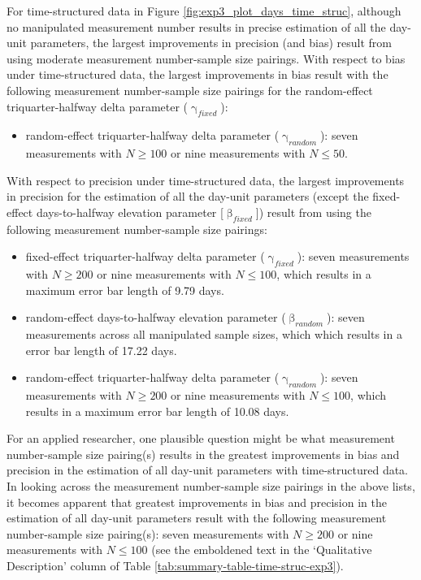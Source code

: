 \documentclass[
12pt, %
twoside,
english]{guelphthesis}
\theoremstyle{definition}
\theoremstyle{definition}
\theoremstyle{definition}
\theoremstyle{definition}
\theoremstyle{remark}
\begin{document}
For time-structured data in Figure \ref{fig:exp3_plot_days_time_struc}, although no manipulated measurement number results in precise estimation of all the day-unit parameters, the largest improvements in precision (and bias) result from using moderate measurement number-sample size pairings. With respect to bias under time-structured data, the largest improvements in bias result with the following measurement number-sample size pairings for the random-effect triquarter-halfway delta parameter (\(\upgamma_{fixed}\)):
\begin{itemize}
\tightlist
\item
  random-effect triquarter-halfway delta parameter (\(\upgamma_{random}\)): seven measurements with \(N \ge 100\) or nine measurements with \(N \le 50\).
\end{itemize}
\noindent With respect to precision under time-structured data, the largest improvements in precision for the estimation of all the day-unit parameters (except the fixed-effect days-to-halfway elevation parameter {[}\(\upbeta_{fixed}\){]}) result from using the following measurement number-sample size pairings:
\begin{itemize}
\tightlist
\item
  fixed-effect triquarter-halfway delta parameter (\(\upgamma_{fixed}\)): seven measurements with \(N \ge 200\) or nine measurements with \(N \le 100\), which results in a maximum error bar length of 9.79 days.
\item
  random-effect days-to-halfway elevation parameter (\(\upbeta_{random}\)): seven measurements across all manipulated sample sizes, which which results in a error bar length of 17.22 days.
\item
  random-effect triquarter-halfway delta parameter (\(\upgamma_{random}\)): seven measurements with \(N \ge 200\) or nine measurements with \(N \le 100\), which results in a maximum error bar length of 10.08 days.
\end{itemize}
For an applied researcher, one plausible question might be what measurement number-sample size pairing(s) results in the greatest improvements in bias and precision in the estimation of all day-unit parameters with time-structured data. In looking across the measurement number-sample size pairings in the above lists, it becomes apparent that greatest improvements in bias and precision in the estimation of all day-unit parameters result with the following measurement number-sample size pairing(s): seven measurements with \(N \ge 200\) or nine measurements with \(N \le 100\) (see the emboldened text in the `Qualitative Description' column of Table \ref{tab:summary-table-time-struc-exp3}).
\end{document}
